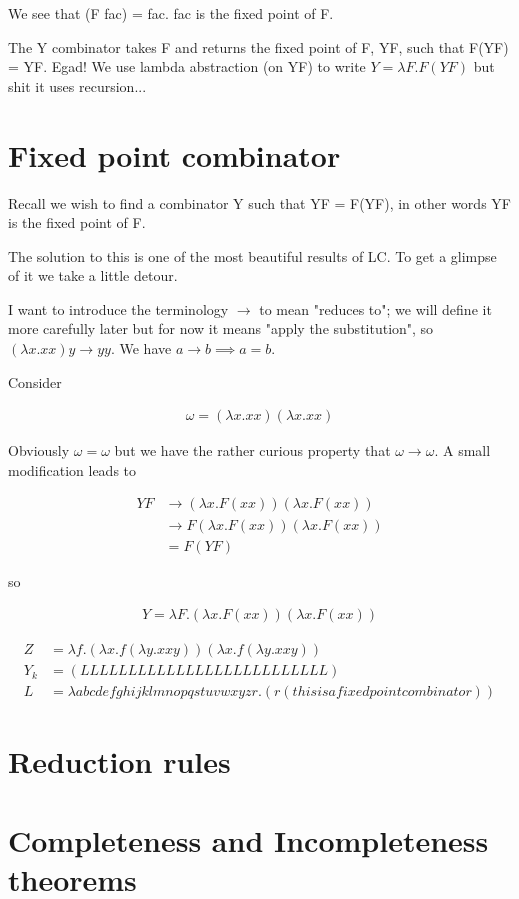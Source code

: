 \documentclass{article}
\begin{document}
We see that (F fac) = fac. fac is the fixed point of F.

The Y combinator takes F and returns the fixed point of F, YF, such that F(YF) = YF. Egad! We use lambda abstraction (on YF) to write $Y = \lambda F. F(YF)$ but shit it uses recursion...

\section{Fixed point combinator}

Recall we wish to find a combinator Y such that YF = F(YF), in other words YF is the fixed point of F.

The solution to this is one of the most beautiful results of LC. To get a glimpse of it we take a little detour.

I want to introduce the terminology $\rightarrow$ to mean "reduces to"; we will define it more carefully later but for now it means "apply the substitution", so $(\lambda x. xx) y \rightarrow yy$. We have $a \rightarrow b \implies a = b$.

Consider

\begin{align}
\omega = (\lambda x. xx) (\lambda x. xx)
\end{align}

Obviously $\omega = \omega$ but we have the rather curious property that $\omega \rightarrow \omega$. A small modification leads to

\begin{align}
YF &\rightarrow (\lambda x. F(xx)) (\lambda x. F(xx))   \\
   &\rightarrow F (\lambda x. F(xx)) (\lambda x. F(xx)) \\
   &= F(YF)
\end{align}

so

\begin{align}
Y = \lambda F.(\lambda x. F(xx)) (\lambda x. F(xx)) 
\end{align}

\begin{align}
Z &= \lambda f. (\lambda x. f (\lambda y. x x y)) (\lambda x. f (\lambda y. x x y)) \\
Y_k &= (L L L L L L L L L L L L L L L L L L L L L L L L L L) \\
L &= \lambda abcdefghijklmnopqstuvwxyzr.(r(thisisafixedpointcombinator)) 
\end{align}

\section{Reduction rules}
\section{Completeness and Incompleteness theorems}
\end{document}
